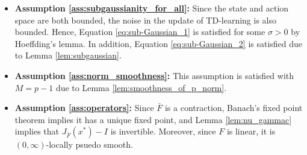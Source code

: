\documentclass[letterpaper, 10 pt]{article}
\begin{document}
\begin{itemize}
\begin{align*}
        &\leq \sum_{s}\nu^{\pi}(s)\left[1-(1-\gamma^n)\mu^\pi(s)\right]^{p-1} \sum_{s'}C^\pi_{ss'}\left(  (V_1-V_2)(s')\right)^p\\
        &\leq \left[1-(1-\gamma^n)\mu^\pi_{\min}\right]^{p-1}\sum_{s}\nu^{\pi}(s) \sum_{s'}C^\pi_{ss'}\left(  (V_1-V_2)(s')\right)^p\\
        &= \left[1-(1-\gamma^n)\mu^\pi_{\min}\right]^{p-1}\sum_{s'}\nu^{\pi}(s') \left(  (V_1-V_2)(s')\right)^p \tag{$\nu^\pi$ is stationary distribution}\\
        &= \left[1-(1-\gamma^n)\mu^\pi_{\min}\right]^{p-1}\|V_1-V_2\|_{\nu^\pi,p}^p.
    \end{align*}
    Therefore, $\bar{F}(V)$ is a contraction with respect to $\|\cdot\|_{\nu^\pi,p}$ with contraction factor $\gamma_c=\left[1-(1-\gamma^n)\mu^\pi_{\min}\right]^{1-1/p}$, and hence Assumption \ref{ass:contraction} is satisfied.
    \item \textbf{Assumption \ref{ass:subgaussianity_for_all}:} Since the state and action space are both bounded, the noise in the update of TD-learning is also bounded. Hence, Equation \eqref{eq:sub-Gaussian_1} is satisfied for some $\sigma>0$ by Hoeffding's lemma. In addition, Equation \eqref{eq:sub-Gaussian_2} is satisfied due to Lemma \ref{lem:subgaussian}. 
    \item \textbf{Assumption \ref{ass:norm_smoothness}:} This assumption is satisfied with $M=p-1$ due to Lemma \ref{lem:smoothness_of_p_norm}.
    \item \textbf{Assumption \ref{ass:operators}:} Since $\bar{F}$ is a contraction, Banach's fixed point theorem implies it has a unique fixed point, and Lemma \ref{lem:nu_gammac} implies that $J_{\bar{F}}(x^*)-I$ is invertible. Moreover, since $F$ is linear, it is $(0,\infty)$-locally psuedo smooth.
    
    
    

\end{itemize}
\end{document}

